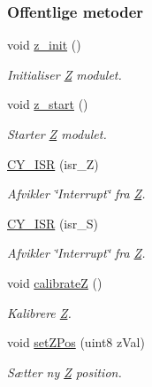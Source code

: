 \subsubsection*{Offentlige metoder}
\begin{DoxyCompactItemize}
\item 
void \hyperlink{class_z_ac6bb96bf63bd2cae7c7bcc2f6b422b0c}{z\+\_\+init} ()
\begin{DoxyCompactList}\small\item\em Initialiser \hyperlink{class_z}{Z} modulet. \end{DoxyCompactList}\item 
void \hyperlink{class_z_affabc649bbf2e5dbeb475777391513d7}{z\+\_\+start} ()
\begin{DoxyCompactList}\small\item\em Starter \hyperlink{class_z}{Z} modulet. \end{DoxyCompactList}\item 
\hyperlink{class_z_a8171ad8aabdbfed5d19fbda53c9d28a9}{C\+Y\+\_\+\+I\+SR} (isr\+\_\+Z)
\begin{DoxyCompactList}\small\item\em Afvikler \char`\"{}\+Interrupt\char`\"{} fra \hyperlink{class_z}{Z}. \end{DoxyCompactList}\item 
\hyperlink{class_z_a55737cff8ccce80876ed873475f484ba}{C\+Y\+\_\+\+I\+SR} (isr\+\_\+S)
\begin{DoxyCompactList}\small\item\em Afvikler \char`\"{}\+Interrupt\char`\"{} fra \hyperlink{class_z}{Z}. \end{DoxyCompactList}\item 
void \hyperlink{class_z_a75e9200c2d48803f4bb723bd1fea24ea}{calibrateZ} ()
\begin{DoxyCompactList}\small\item\em Kalibrere \hyperlink{class_z}{Z}. \end{DoxyCompactList}\item 
void \hyperlink{class_z_a32c07d919fae10a36ead3ac6766f7355}{set\+Z\+Pos} (uint8 z\+Val)
\begin{DoxyCompactList}\small\item\em Sætter ny \hyperlink{class_z}{Z} position. \end{DoxyCompactList}\end{DoxyCompactItemize}
